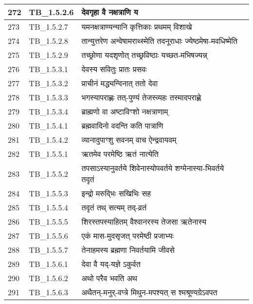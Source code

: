\documentclass[17pt]{extarticle}
\begin{document}
\begin{longtable}{||p{0.4in}||p{0.9in}||p{4.0in}||p{0.9in}||}
        \hline
            272 & TB\_1.5.2.6 & देवगृहा वै नक्षत्राणि य &      \\
        \hline
            273 & TB\_1.5.2.7 & यमनक्षत्राण्यन्यानि कृत्तिकाः प्रथमम् विशाखे &      \\
        \hline
            274 & TB\_1.5.2.8 & तान्युत्तरेण अन्वेषामराथ्स्मेति तदनूराधाः ज्येष्ठमेषा{-}मवधिष्मेति &      \\
        \hline
            275 & TB\_1.5.2.9 & तच्छ्रोणा यदशृणोत् तच्छ्रविष्ठाः यच्छत{-}मभिषज्यन्न् &      \\
        \hline
            276 & TB\_1.5.3.1 & देवस्य सवितुः प्रातः प्रसवः &      \\
        \hline
            277 & TB\_1.5.3.2 & प्राचीनं मद्ध्यन्दिनात् ततो देवा &      \\
        \hline
            278 & TB\_1.5.3.3 & भगस्यापराह्णः तत्{-}पुण्यं तेजस्व्यहः तस्मादपराह्णे &      \\
        \hline
            279 & TB\_1.5.3.4 & ब्राह्मणो वा अष्टाविꣳशो नक्षत्राणाम् &      \\
        \hline
            280 & TB\_1.5.4.1 & ब्रह्मवादिनो वदन्ति कति पात्राणि &      \\
        \hline
            281 & TB\_1.5.4.2 & व्यानादुपाꣳशु सवनम् वाच ऐन्द्रवायवम् &      \\
        \hline
            282 & TB\_1.5.5.1 & ऋतमेव परमेष्ठि ऋतं नात्येति &      \\
        \hline
            283 & TB\_1.5.5.2 & तपसाऽस्यानुवर्तये शिवेनास्योपवर्तये शग्मेनास्या{-}भिवर्तये तदृतं &      \\
        \hline
            284 & TB\_1.5.5.3 & इन्द्रो मरुद्भिः सखिभिः सह &      \\
        \hline
            285 & TB\_1.5.5.4 & तदृतं तथ् सत्यम् तद्{-}व्रतं &      \\
        \hline
            286 & TB\_1.5.5.5 & शिरस्तपस्याहितम् वैश्वानरस्य तेजसा ऋतेनास्य &      \\
        \hline
            287 & TB\_1.5.5.6 & एकं मास{-}मुदसृजत् परमेष्ठी प्रजाभ्यः &      \\
        \hline
            288 & TB\_1.5.5.7 & तेनाहमस्य ब्रह्मणा निवर्तयामि जीवसे &      \\
        \hline
            289 & TB\_1.5.6.1 & देवा वै यद्{-}यज्ञे ऽकुर्वत &      \\
        \hline
            290 & TB\_1.5.6.2 & अथो परैव भवति अथ &      \\
        \hline
            291 & TB\_1.5.6.3 & अथैतन्{-}मनुर्{-}वप्त्रे मिथुन{-}मपश्यत् स श्मश्रूण्यग्रेऽवपत &      \\

\end{longtable}
\end{document}
